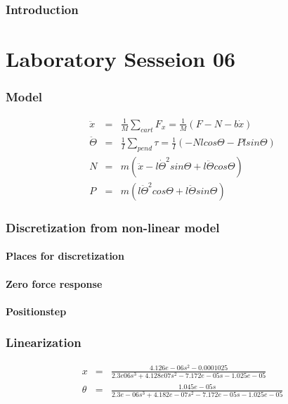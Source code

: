 \section*{Introduction}


\part{Laboratory Sesseion 06}

\section{Model}


	\begin{eqnarray}
		\ddot{x} &=& \frac{1}{M} \sum_{cart} F_x = \frac{1}{M} \left( F - N - b\dot{x}\right)  \\
		\ddot{\Theta} &=& \frac{1}{I} \sum_{pend} \tau = \frac{1}{I} \left( -Nlcos\Theta - Plsin\Theta \right)  \\
		N &=& m\left( \ddot{x} - l\dot{\Theta}^2 sin\Theta + l\ddot{\Theta}cos\Theta\right)  \\
		P &=& m\left( l\ddot{\Theta}^2cos\Theta + l\ddot{\Theta}sin \Theta\right) 
	\end{eqnarray}
	


\section{Discretization from non-linear model}
	
	\subsection{Places for discretization}
	
	\subsection{Zero force response}
	
	\subsection{Positionstep}

\section{Linearization}

	\begin{eqnarray}
		x &=& \frac{4.126e-06 s^2 - 0.0001025}{2.3e06 s^3+ 4.128e07 s^2 - 7.172e-05 s -1.025e-05}\\
		\theta &=& \frac{1.045e-05 s}{2.3e-06 s^3 + 4.182e-07 s^2 - 7.172e-05 s - 1.025e-05}
	\end{eqnarray}


